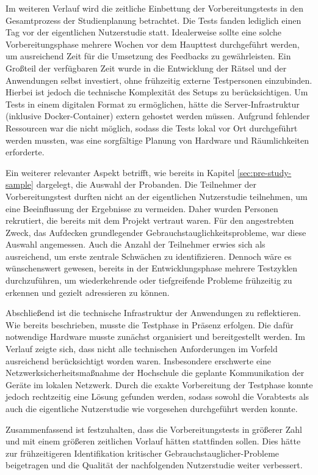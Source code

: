 Im weiteren Verlauf wird die zeitliche Einbettung der Vorbereitungstests in den Gesamtprozess der Studienplanung betrachtet. Die Tests fanden lediglich einen Tag vor der eigentlichen Nutzerstudie statt. Idealerweise sollte eine solche Vorbereitungsphase mehrere Wochen vor dem Haupttest durchgeführt werden, um ausreichend Zeit für die Umsetzung des Feedbacks zu gewährleisten. Ein Großteil der verfügbaren Zeit wurde in die Entwicklung der Rätsel und der Anwendungen selbst investiert, ohne frühzeitig externe Testpersonen einzubinden. Hierbei ist jedoch die technische Komplexität des Setups zu berücksichtigen. Um Tests in einem digitalen Format zu ermöglichen, hätte die Server-Infrastruktur (inklusive Docker-Container) extern gehostet werden müssen. Aufgrund fehlender Ressourcen war die nicht möglich, sodass die Tests lokal vor Ort durchgeführt werden mussten, was eine sorgfältige Planung von Hardware und Räumlichkeiten erforderte.

Ein weiterer relevanter Aspekt betrifft, wie bereits in Kapitel \ref{sec:pre-study-sample} dargelegt, die Auswahl der Probanden. Die Teilnehmer der Vorbereitungstest durften nicht an der eigentlichen Nutzerstudie teilnehmen, um eine Beeinflussung der Ergebnisse zu vermeiden. Daher wurden Personen rekrutiert, die bereits mit dem Projekt vertraut waren. Für den angestrebten Zweck, das Aufdecken grundlegender Gebrauchstauglichkeitsprobleme, war diese Auswahl angemessen. Auch die Anzahl der Teilnehmer erwies sich als ausreichend, um erste zentrale Schwächen zu identifizieren. Dennoch wäre es wünschenswert gewesen, bereits in der Entwicklungsphase mehrere Testzyklen durchzuführen, um wiederkehrende oder tiefgreifende Probleme frühzeitig zu erkennen und gezielt adressieren zu können.

Abschließend ist die technische Infrastruktur der Anwendungen zu reflektieren. Wie bereits beschrieben, musste die Testphase in Präsenz erfolgen. Die dafür notwendige Hardware musste zunächst organisiert und bereitgestellt werden. Im Verlauf zeigte sich, dass nicht alle technischen Anforderungen im Vorfeld ausreichend berücksichtigt worden waren. Insbesondere erschwerte eine Netzwerksicherheitsmaßnahme der Hochschule die geplante Kommunikation der Geräte im lokalen Netzwerk. Durch die exakte Vorbereitung der Testphase konnte jedoch rechtzeitig eine Lösung gefunden werden, sodass sowohl die Vorabtests als auch die eigentliche Nutzerstudie wie vorgesehen durchgeführt werden konnte.

Zusammenfassend ist festzuhalten, dass die Vorbereitungstests in größerer Zahl und mit einem größeren zeitlichen Vorlauf hätten stattfinden sollen. Dies hätte zur frühzeitigeren Identifikation kritischer Gebrauchstauglicher-Probleme beigetragen und die Qualität der nachfolgenden Nutzerstudie weiter verbessert.











